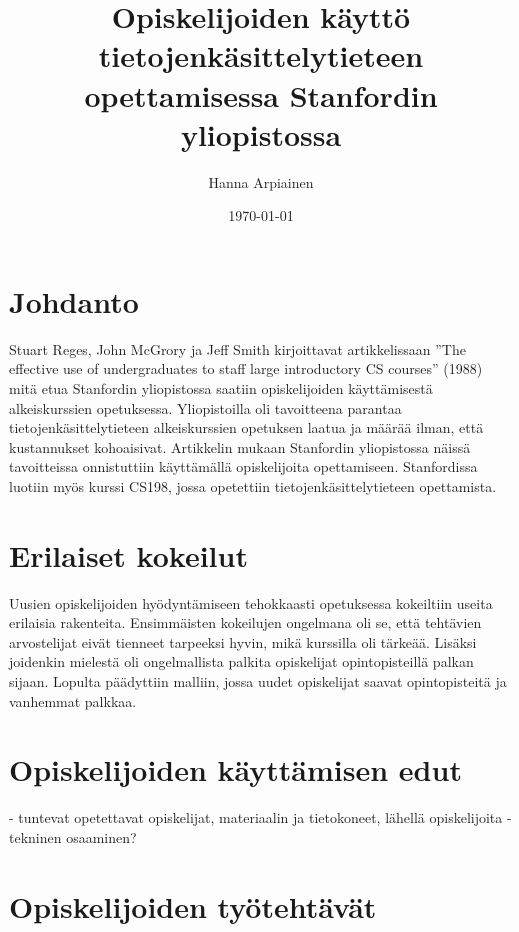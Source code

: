 \documentclass[finnish]{tktltiki2}
\title{﻿Opiskelijoiden käyttö tietojenkäsittelytieteen opettamisessa Stanfordin yliopistossa}
\author{Hanna Arpiainen}
\date{\today}
\theoremstyle{definition}
\theoremstyle{remark}
\begin{document}
\maketitle
\makeabstract

\tableofcontents
\newpage



\section{Johdanto}

Stuart Reges, John McGrory ja Jeff Smith kirjoittavat artikkelissaan ”The effective use of undergraduates to staff large introductory CS courses” (1988) mitä etua Stanfordin yliopistossa saatiin opiskelijoiden käyttämisestä alkeiskurssien opetuksessa. Yliopistoilla oli tavoitteena parantaa tietojenkäsittelytieteen alkeiskurssien opetuksen laatua ja määrää ilman, että kustannukset kohoaisivat. Artikkelin mukaan Stanfordin yliopistossa näissä tavoitteissa onnistuttiin käyttämällä opiskelijoita opettamiseen. Stanfordissa luotiin myös kurssi CS198, jossa opetettiin tietojenkäsittelytieteen opettamista.



\section{Erilaiset kokeilut}

Uusien opiskelijoiden hyödyntämiseen tehokkaasti opetuksessa kokeiltiin useita erilaisia rakenteita. Ensimmäisten kokeilujen ongelmana oli se, että tehtävien arvostelijat eivät tienneet tarpeeksi hyvin, mikä kurssilla oli tärkeää. Lisäksi joidenkin mielestä oli ongelmallista palkita opiskelijat opintopisteillä palkan sijaan. Lopulta päädyttiin malliin, jossa uudet opiskelijat saavat opintopisteitä ja vanhemmat palkkaa.



\section{Opiskelijoiden käyttämisen edut}

- tuntevat opetettavat opiskelijat, materiaalin ja tietokoneet, lähellä opiskelijoita
-tekninen osaaminen?



\section{Opiskelijoiden työtehtävät}
\end{document}
